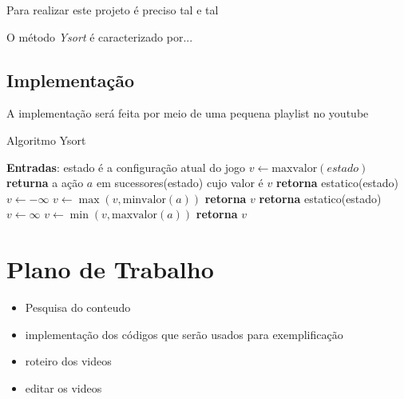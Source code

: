 \documentclass[a4paper,10pt]{article} %
\begin{document}

Para realizar este projeto é preciso tal e tal

O método \emph{Ysort} é caracterizado por...

\subsection{Implementação}

A implementação será feita por meio de uma pequena playlist no youtube


\begin{algorithm}
\caption{Algoritmo Ysort}\label{alg:ysort}
\begin{algorithmic}[1]
\State \textbf{Entradas}: estado é a configuração atual do jogo
\State $v\gets \mathrm{maxvalor}{(estado)}$
\State \textbf{returna} a ação $a$ em sucessores(estado) cujo valor é $v$ %
\EndFunction
{}
   \State \textbf{retorna} estatico(estado)
\EndIf
\State $v \gets -\infty$
    \State $v \gets \max{(v, \mathrm{minvalor}(a))}$
\EndFor
\State \textbf{retorna} $v$
\EndFunction
{}
   \State \textbf{retorna} estatico(estado)
\EndIf
\State $v \gets \infty$
    \State $v \gets \min{(v, \mathrm{maxvalor}(a))}$
\EndFor
\State \textbf{retorna} $v$
\EndFunction
\end{algorithmic}
\end{algorithm}

\section{Plano de Trabalho}

 \begin{itemize}
  \item Pesquisa do conteudo
  \item implementação dos códigos que serão usados para exemplificação
  \item roteiro dos videos
  \item editar os videos 
 \end{itemize}
\end{document}
